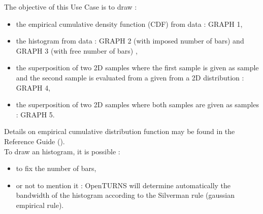 \renewcommand{\filename}{docUC_InputWithData_EmpiricalDrawing.tex}
\renewcommand{\filetitle}{UC : Drawing Empirical CDF, Histogram, Clouds / PDF or superposition of two clouds from data}

\HeaderIIILevel






The objective of this Use Case is to draw :
\begin{itemize}
\item the empirical cumulative density function (CDF) from data : GRAPH 1,
\item the histogram from data : GRAPH 2 (with imposed number of bars) and GRAPH 3 (with free number of bars) ,
\item the superposition of two 2D samples where the first sample is given as sample and the second sample is evaluated from a given from a 2D distribution : GRAPH 4,
\item the superposition of two 2D samples where both samples are given as samples : GRAPH 5.
\end{itemize}



Details on empirical cumulative distribution function may be found in the Reference Guide ().\\



To draw an histogram, it is possible :
\begin{itemize}
\item to fix the number of bars,
\item or not to mention it : OpenTURNS will determine automatically the bandwidth of the histogram according to the Silverman rule (gaussian empirical rule).
\end{itemize}

